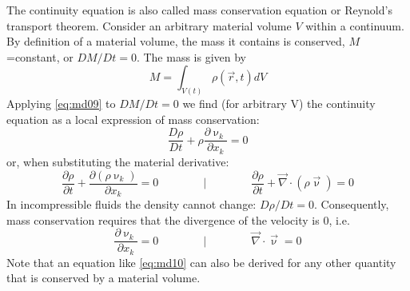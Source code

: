 The continuity equation is also called mass conservation equation or
Reynold’s transport theorem.
Consider an arbitrary material volume $V$ within a continuum. 
By definition of a material
volume, the mass it contains is conserved, $M$=constant, or
$DM/Dt=0$.
The mass is given by
\[
M=\int_{V(t)} \rho(\vec{r},t) dV
\]
Applying \eqref{eq:md09} to $DM/Dt=0$ we find 
(for arbitrary V) the continuity
equation as a local expression of mass conservation:
\begin{equation}
\frac{D\rho}{Dt} + \rho \frac{\partial \upnu_k}{\partial x_k} =0
\label{eq:md10}
\end{equation}
or, when substituting the material derivative:
\begin{equation}
\frac{\partial \rho}{\partial t} + \frac{\partial (\rho \upnu_k)}{\partial x_k} =0
\qquad
\qquad
\bigg\rvert
\qquad
\qquad
\frac{\partial \rho}{\partial t} + \vec\nabla\cdot (\rho \vec\upnu) =0
\end{equation}
In incompressible fluids the density cannot change: $D\rho/Dt=0$.
Consequently, mass
conservation requires that the divergence of the velocity is 0, i.e.
\begin{equation}
\frac{\partial \upnu_k}{\partial x_k} = 0
\qquad
\qquad
\bigg\rvert
\qquad
\qquad
\vec\nabla \cdot \vec\upnu = 0
\end{equation}
Note that an equation like \eqref{eq:md10}
can also be derived for any other quantity that is
conserved by a material volume.


\vspace{0.5cm}
\vspace{0.5cm}

\vspace{0.5cm}



